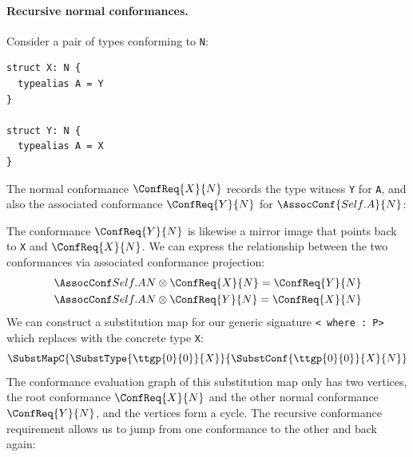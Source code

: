 \documentclass[../generics]{subfiles}
\begin{document}
\paragraph{Recursive normal conformances.} Consider a pair of types conforming to \texttt{N}:
\begin{Verbatim}
struct X: N {
  typealias A = Y
}

struct Y: N {
  typealias A = X
}
\end{Verbatim}
The normal conformance $\ConfReq{X}{N}$ records the type witness \verb|Y| for \verb|A|, and also the associated conformance $\ConfReq{Y}{N}$ for $\AssocConf{Self.A}{N}$:
\begin{quote}
\end{quote}
The conformance $\ConfReq{Y}{N}$ is likewise a mirror image that points back to \verb|X| and $\ConfReq{X}{N}$. We can express the relationship between the two conformances via associated conformance projection:
\begin{gather*}
\SelfAToN \otimes \ConfReq{X}{N} = \ConfReq{Y}{N}\\
\SelfAToN \otimes \ConfReq{Y}{N} = \ConfReq{X}{N}
\end{gather*}
%
%
We can construct a substitution map for our generic signature \texttt{< where :\ P>} which replaces  with the concrete type \texttt{X}:
\[\SubstMapC{\SubstType{\ttgp{0}{0}}{X}}{\SubstConf{\ttgp{0}{0}}{X}{N}}\]
The conformance evaluation graph of this substitution map only has two vertices, the root conformance $\ConfReq{X}{N}$ and the other normal conformance $\ConfReq{Y}{N}$, and the vertices form a cycle. The recursive conformance requirement allows us to jump from one conformance to the other and back again:
\begin{quote}
\end{quote}
\end{document}
